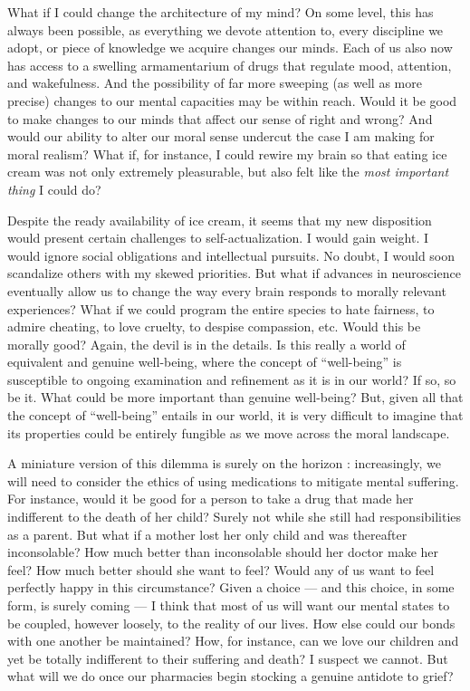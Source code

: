\documentclass[a4paper,14pt]{extbook}
\begin{document}
What if I could change the architecture of my mind?
On some level, this has always been possible, as everything we devote attention to, every discipline we adopt, or piece of knowledge we acquire changes our minds.
Each of us also now has access to a swelling armamentarium of drugs that regulate mood, attention, and wakefulness.
And the possibility of far more sweeping (as well as more precise) changes to our mental capacities may be within reach.
Would it be good to make changes to our minds that affect our sense of right and wrong?
And would our ability to alter our moral sense undercut the case I am making for moral realism?
What if, for instance, I could rewire my brain so that eating ice cream was not only extremely pleasurable, but also felt like the \textit{most important thing} I could do?

Despite the ready availability of ice cream, it seems that my new disposition would present certain challenges to self-actualization.
I would gain weight.
I would ignore social obligations and intellectual pursuits.
No doubt, I would soon scandalize others with my skewed priorities.
But what if advances in neuroscience eventually allow us to change the way every brain responds to morally relevant experiences?
What if we could program the entire species to hate fairness, to admire cheating, to love cruelty, to despise compassion, etc.
Would this be morally good?
Again, the devil is in the details.
Is this really a world of equivalent and genuine well-being, where the concept of ``well-being'' is susceptible to ongoing examination and refinement as it is in our world?
If so, so be it.
What could be more important than genuine well-being?
But, given all that the concept of ``well-being'' entails in our world, it is very difficult to imagine that its properties could be entirely fungible as we move across the moral landscape.

A miniature version of this dilemma is surely on the horizon :
increasingly, we will need to consider the ethics of using medications to mitigate mental suffering.
For instance, would it be good for a person to take a drug that made her indifferent to the death of her child?
Surely not while she still had responsibilities as a parent.
But what if a mother lost her only child and was thereafter inconsolable?
How much better than inconsolable should her doctor make her feel?
How much better should she want to feel?
Would any of us want to feel perfectly happy in this circumstance?
Given a choice --- and this choice, in some form, is surely coming --- I think that most of us will want our mental states to be coupled, however loosely, to the reality of our lives.
How else could our bonds with one another be maintained?
How, for instance, can we love our children and yet be totally indifferent to their suffering and death?
I suspect we cannot.
But what will we do once our pharmacies begin stocking a genuine antidote to grief?
\end{document}
